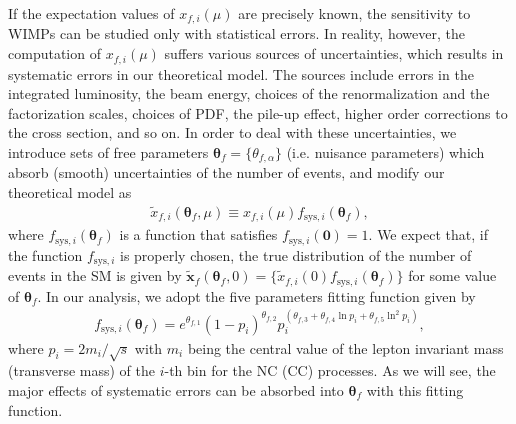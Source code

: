 \documentclass[12pt,twoside,book]{article}
\begin{document}
If the expectation values of $x_{f,i} (\mu)$ are precisely known, the sensitivity to WIMPs can be studied only with statistical errors.
In reality, however, the computation of $x_{f,i} (\mu)$ suffers various sources of uncertainties, which results in systematic errors in our theoretical model.
The sources include errors in the integrated luminosity, the beam energy, choices of the renormalization and the factorization scales, choices of PDF, the pile-up effect, higher order corrections to the cross section, and so on.
In order to deal with these uncertainties, we introduce sets of free parameters $\bm{\theta}_f = \{ \theta_{f,\alpha} \}$ (i.e. nuisance parameters) which absorb (smooth) uncertainties of the number of events, and modify our theoretical model as
\begin{align}
  \tilde{x}_{f,i} (\bm{\theta}_f, \mu) \equiv x_{f,i} (\mu)
  f_{\mathrm{sys}, i}(\bm{\theta}_f),\label{eq_xtilde}
\end{align}
where $f_{\mathrm{sys}, i}(\bm{\theta}_f)$ is a function that satisfies $f_{\mathrm{sys}, i}(\bm{0}) =1$.
We expect that, if the function $f_{\mathrm{sys}, i}$ is properly chosen, the true distribution of the number of events in the SM is given by $\tilde{\bm{x}}_f (\bm{\theta}_f,0) = \{ \tilde{x}_{f,i} (0) f_{\mathrm{sys}, i}(\bm{\theta}_f)\}$ for some value of $\bm{\theta}_f$.
In our analysis, we adopt the five parameters fitting function given by~\cite{Aaltonen:2008dn}
\begin{align}
  f_{\mathrm{sys}, i} (\bm{\theta}_f) =
  e^{\theta_{f,1}} (1 - p_i)^{\theta_{f,2}}
  p_i^{(\theta_{f,3} + \theta_{f,4} \ln p_i + \theta_{f,5} \ln^2 p_i)},
  \label{eq_f_theta}
\end{align}
where $p_i = 2m_{i} / \sqrt{s}$ with $m_i$ being the central value of the lepton invariant mass (transverse mass) of the $i$-th bin for the NC (CC) processes.
As we will see, the major effects of systematic errors can be absorbed into $\bm{\theta}_f$ with this fitting function.
\end{document}
